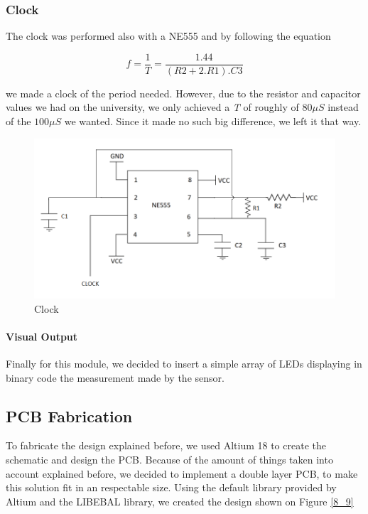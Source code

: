 \subsubsection{\color{red}Clock}

The clock was performed also with a NE555 and by following the equation

\[
f=\frac{1}{T}=\frac{1.44}{(R2+2.R1).C3}
\]

we made a clock of the period needed. However, due to the resistor
and capacitor values we had on the university, we only achieved a
\emph{T} of roughly of $80\mu S$ instead of the $100\mu S$ we wanted.
Since it made no such big difference, we left it that way.

\begin{figure}[h!]
\begin{centering}
\includegraphics[scale=0.5]{../Exercise8/Informe/images/CLOCK}
\par\end{centering}
\caption{\color{cyan}Clock}

\label{8_8}

\end{figure}

\paragraph{Visual Output}

Finally for this module, we decided to insert a simple array of LEDs
displaying in binary code the measurement made by the sensor.

\subsection{\color{purple}PCB Fabrication}

To fabricate the design explained before, we used Altium 18 to create
the schematic and design the PCB. Because of the amount of things
taken into account explained before, we decided to implement a double
layer PCB, to make this solution fit in an respectable size. Using
the default library provided by Altium and the LIBEBAL library, we
created the design shown on Figure \ref{8_9}

